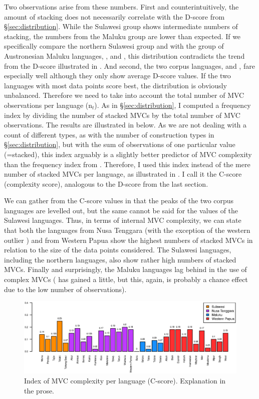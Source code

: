 Two observations arise from these numbers. First and counterintuitively, the amount of stacking does not necessarily correlate with the D-score from §\ref{sec:distribution}. While the Sulawesi group shows intermediate numbers of stacking, the numbers from the Maluku group are lower than expected. If we specifically compare the northern Sulawesi group  and  with the group of Austronesian Maluku languages, ,  and , this distribution contradicts the trend from the D-score illustrated in . And second, the two corpus languages,  and , fare especially well although they only show average D-score values. If the two languages with most data points score best, the distribution is obviously unbalanced. Therefore we need to take into account the total number of MVC observations per language (n$_t$). As in §\ref{sec:distribution}, I computed a frequency index by dividing the number of stacked MVCs by the total number of MVC observations. The results are illustrated in  below. As we are not dealing with a count of different types, as with the number of construction types in §\ref{sec:distribution}, but with the sum of observations of one particular value (=stacked), this index arguably is a slightly better predictor of MVC complexity than the frequency index from . Therefore, I used this index instead of the mere number of stacked MVCs per language, as illustrated in . I call it the C-score (complexity score), analogous to the D-score from the last section.

We can gather from the C-score values in  that the peaks of the two corpus languages are levelled out, but the same cannot be said for the values of the Sulawesi languages. Thus, in terms of internal MVC complexity, we can state that both the languages from Nusa Tenggara (with the exception of the western outlier ) and from Western Papua show the highest numbers of stacked MVCs in relation to the size of the data points considered. The Sulawesi languages, including the northern languages, also show rather high numbers of stacked MVCs. Finally and surprisingly, the Maluku languages lag behind in the use of complex MVCs ( has gained a little, but this, again, is probably a chance effect due to the low number of observations). 

\begin{figure}
\includegraphics[width=\textwidth]{figures/index_MVCcomplexity_clean.eps}
\caption[Index of MVC complexity per language]{Index of MVC complexity per language (C-score). Explanation in the prose.}\label{fig:complexity}
\end{figure}

